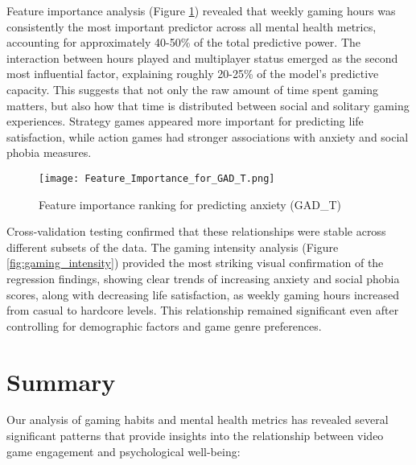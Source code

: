 \documentclass[12pt]{article}
\begin{document}
Feature importance analysis (Figure \ref{fig:feature_importance}) revealed that weekly gaming hours was consistently the most important predictor across all mental health metrics, accounting for approximately 40-50\% of the total predictive power. The interaction between hours played and multiplayer status emerged as the second most influential factor, explaining roughly 20-25\% of the model's predictive capacity. This suggests that not only the raw amount of time spent gaming matters, but also how that time is distributed between social and solitary gaming experiences. Strategy games appeared more important for predicting life satisfaction, while action games had stronger associations with anxiety and social phobia measures.

\begin{figure}[H]
\centering
\texttt{[image: Feature\_Importance\_for\_GAD\_T.png]}
\caption{Feature importance ranking for predicting anxiety (GAD\_T)}
\label{fig:feature_importance}
\end{figure}

Cross-validation testing confirmed that these relationships were stable across different subsets of the data. The gaming intensity analysis (Figure \ref{fig:gaming_intensity}) provided the most striking visual confirmation of the regression findings, showing clear trends of increasing anxiety and social phobia scores, along with decreasing life satisfaction, as weekly gaming hours increased from casual to hardcore levels. This relationship remained significant even after controlling for demographic factors and game genre preferences.

\section{Summary}

Our analysis of gaming habits and mental health metrics has revealed several significant patterns that provide insights into the relationship between video game engagement and psychological well-being:
\end{document}
